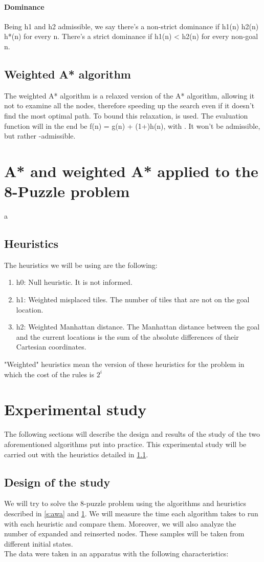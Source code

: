 \documentclass[runningheads]{llncs}
\begin{document}
\paragraph{Dominance}
Being h1 and h2 admissible, we say there's a non-strict dominance if h1(n) \leq h2(n) \leq h*(n) for every n.
There's a strict dominance if h1(n) < h2(n) for every non-goal n.
\subsection{Weighted A* algorithm}
The weighted A* algorithm is a relaxed version of the A* algorithm, allowing it not to examine all the nodes, therefore speeding up the search even if it doesn't find the most optimal path. To bound this relaxation, \epsilon is used. The evaluation function will in the end be f(n) = g(n) + (1+\epsilon)h(n), with \epsilon {}. It won't be admissible, but rather \epsilon-admissible.

\section{A* and weighted A* applied to the 8-Puzzle problem} \label{s:awa8p}
a
\subsection{Heuristics}\label{ss:heuristics}
The heuristics we will be using are the following:
\begin{enumerate}
\item h0: Null heuristic. It is not informed.
\item h1: Weighted misplaced tiles. The number of tiles that are not on the goal location.
\item h2: Weighted Manhattan distance. The Manhattan distance between the goal and the current locations is the sum of the absolute differences of their Cartesian coordinates.
\end{enumerate}
"Weighted" heuristics mean the version of these heuristics for the problem in which the cost of the rules is \(2^i\)

\section{Experimental study}
The following sections will describe the design and results of the study of the two aforementioned algorithms put into practice. This experimental study will be carried out with the heuristics detailed in \ref{ss:heuristics}.
\subsection{Design of the study}
We will try to solve the 8-puzzle problem using the algorithms and heuristics described in \ref{s:awa} and \ref{s:awa8p}. We will measure the time each algorithm takes to run with each heuristic and compare them. Moreover, we will also analyze the number of expanded and reinserted nodes. These samples will be taken from different initial states.
\\
The data were taken in an apparatus with the following characteristics:
\end{document}
